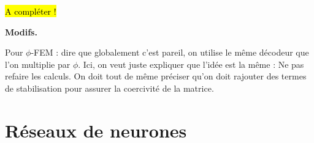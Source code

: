 \documentclass[french]{article}
\begin{document}
	\hl{A compléter !}
	
	\begin{tcolorbox}[
		colback=white, %
		colframe=red!70!black, %
		arc=2mm, %
		boxrule=1pt, %
		breakable, enhanced jigsaw
		]
		\textcolor{red!70!black}{\textbf{Modifs.} \\}
		
		Pour $\phi$-FEM : dire que globalement c'est pareil, on utilise le même décodeur que l'on multiplie par $\phi$. Ici, on veut juste expliquer que l'idée est la même : Ne pas refaire les calculs. On doit tout de même préciser qu'on doit rajouter des termes de stabilisation pour assurer la coercivité de la matrice.
	\end{tcolorbox}

	\section{Réseaux de neurones}
\end{document}
